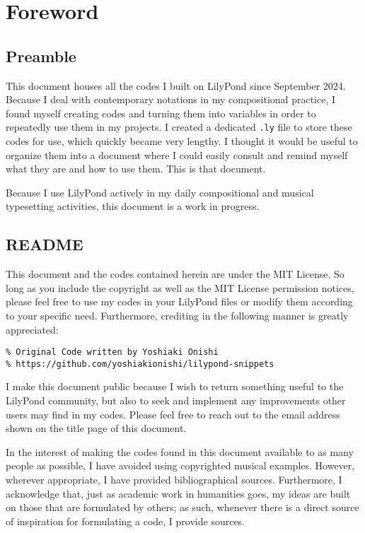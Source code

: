 \chapter{Foreword}
\section{Preamble}
This document houses all the codes I built on LilyPond since September 2024. Because I deal with contemporary notations in my compositional practice, I found myself creating codes and turning them into variables in order to repeatedly use them in my projects. I created a dedicated \verb|.ly| file to store these codes for use, which quickly became very lengthy. I thought it would be useful to organize them into a document where I could easily consult and remind myself what they are and how to use them. This is that document.

Because I use LilyPond actively in my daily compositional and musical typesetting activities, this document is a work in progress. 

\section{README}

This document and the codes contained herein are under the MIT License. So long as you include the copyright as well as the MIT License permission notices, please feel free to use my codes in your LilyPond files or modify them according to your specific need. Furthermore, crediting in the following manner is greatly appreciated:

\begin{verbatim}
% Original Code written by Yoshiaki Onishi
% https://github.com/yoshiakionishi/lilypond-snippets
\end{verbatim}

I make this document public because I wish to return something useful to the LilyPond community, but also to seek and implement any improvements other users may find in my codes. Please feel free to reach out to the email address shown on the title page of this document.

In the interest of making the codes found in this document available to as many people as possible, I have avoided using copyrighted musical examples. However, wherever appropriate, I have provided bibliographical sources. Furthermore, I acknowledge that, just as academic work in humanities goes, my ideas are built on those that are formulated by others; as such, whenever there is a direct source of inspiration for formulating a code, I provide sources. 


